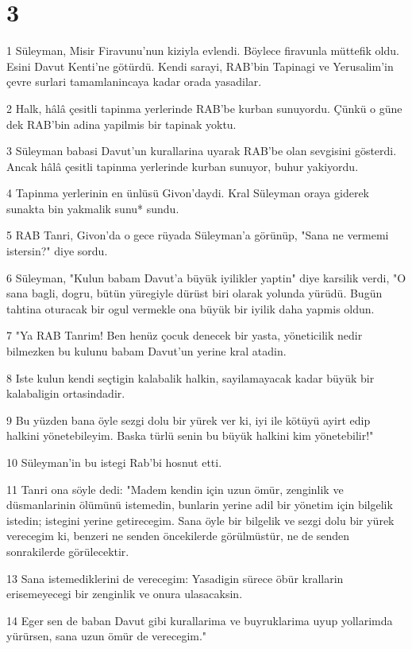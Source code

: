 \chapter{3}

\par 1 Süleyman, Misir Firavunu'nun kiziyla evlendi. Böylece firavunla müttefik oldu. Esini Davut Kenti'ne götürdü. Kendi sarayi, RAB'bin Tapinagi ve Yerusalim'in çevre surlari tamamlanincaya kadar orada yasadilar.
\par 2 Halk, hâlâ çesitli tapinma yerlerinde RAB'be kurban sunuyordu. Çünkü o güne dek RAB'bin adina yapilmis bir tapinak yoktu.
\par 3 Süleyman babasi Davut'un kurallarina uyarak RAB'be olan sevgisini gösterdi. Ancak hâlâ çesitli tapinma yerlerinde kurban sunuyor, buhur yakiyordu.
\par 4 Tapinma yerlerinin en ünlüsü Givon'daydi. Kral Süleyman oraya giderek sunakta bin yakmalik sunu* sundu.
\par 5 RAB Tanri, Givon'da o gece rüyada Süleyman'a görünüp, "Sana ne vermemi istersin?" diye sordu.
\par 6 Süleyman, "Kulun babam Davut'a büyük iyilikler yaptin" diye karsilik verdi, "O sana bagli, dogru, bütün yüregiyle dürüst biri olarak yolunda yürüdü. Bugün tahtina oturacak bir ogul vermekle ona büyük bir iyilik daha yapmis oldun.
\par 7 "Ya RAB Tanrim! Ben henüz çocuk denecek bir yasta, yöneticilik nedir bilmezken bu kulunu babam Davut'un yerine kral atadin.
\par 8 Iste kulun kendi seçtigin kalabalik halkin, sayilamayacak kadar büyük bir kalabaligin ortasindadir.
\par 9 Bu yüzden bana öyle sezgi dolu bir yürek ver ki, iyi ile kötüyü ayirt edip halkini yönetebileyim. Baska türlü senin bu büyük halkini kim yönetebilir!"
\par 10 Süleyman'in bu istegi Rab'bi hosnut etti.
\par 11 Tanri ona söyle dedi: "Madem kendin için uzun ömür, zenginlik ve düsmanlarinin ölümünü istemedin, bunlarin yerine adil bir yönetim için bilgelik istedin; istegini yerine getirecegim. Sana öyle bir bilgelik ve sezgi dolu bir yürek verecegim ki, benzeri ne senden öncekilerde görülmüstür, ne de senden sonrakilerde görülecektir.
\par 13 Sana istemediklerini de verecegim: Yasadigin sürece öbür krallarin erisemeyecegi bir zenginlik ve onura ulasacaksin.
\par 14 Eger sen de baban Davut gibi kurallarima ve buyruklarima uyup yollarimda yürürsen, sana uzun ömür de verecegim."
